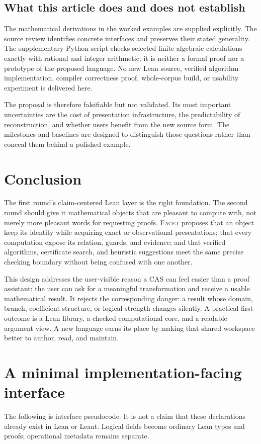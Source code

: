 \documentclass[11pt,letterpaper]{article}
\newcommand{\Facet}{\textsc{Facet}}
\numberwithin{equation}{section}
\begin{document}
\subsection{What this article does and does not establish}
The mathematical derivations in the worked examples are supplied explicitly.
The source review identifies concrete interfaces and preserves their stated
generality. The supplementary Python script checks selected finite algebraic
calculations exactly with rational and integer arithmetic; it is neither a
formal proof nor a prototype of the proposed language. No new Lean source,
verified algorithm implementation, compiler correctness proof, whole-corpus
build, or usability experiment is delivered here.

The proposal is therefore falsifiable but not validated. Its most important
uncertainties are the cost of presentation infrastructure, the predictability
of reconstruction, and whether users benefit from the new source form. The
milestones and baselines are designed to distinguish those questions rather
than conceal them behind a polished example.

\section{Conclusion}
The first round's claim-centered Lean layer is the right foundation. The second
round should give it mathematical objects that are pleasant to compute with,
not merely more pleasant words for requesting proofs. \Facet{} proposes that
an object keep its identity while acquiring exact or observational presentations;
that every computation expose its relation, guards, and evidence; and that
verified algorithms, certificate search, and heuristic suggestions meet the same
precise checking boundary without being confused with one another.

This design addresses the user-visible reason a CAS can feel easier than a proof
assistant: the user can ask for a meaningful transformation and receive a usable
mathematical result. It rejects the corresponding danger: a result whose domain,
branch, coefficient structure, or logical strength changes silently. A practical
first outcome is a Lean library, a checked computational core, and a readable
argument view. A new language earns its place by making that shared workspace
better to author, read, and maintain.

\appendix
\clearpage
\section{A minimal implementation-facing interface}\label{app:interface}
The following is interface pseudocode. It is not a claim that these declarations
already exist in Lean or Leant. Logical fields become ordinary Lean types and
proofs; operational metadata remains separate.
\end{document}
